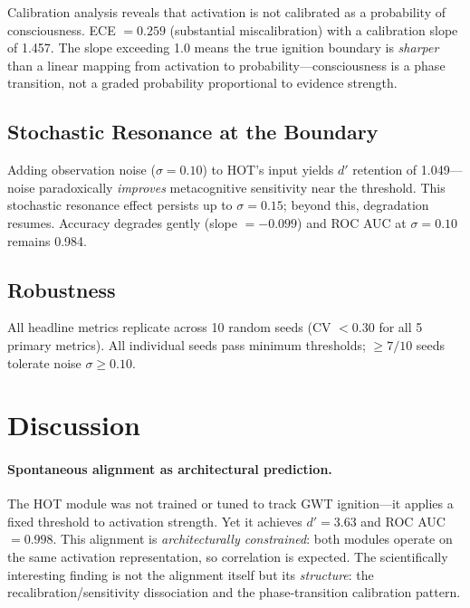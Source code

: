\documentclass[10pt,letterpaper]{article}
\newcommand{\dprime}{d'}
\begin{document}
Calibration analysis reveals that activation is not calibrated as a
probability of consciousness.  ECE $= 0.259$ (substantial
miscalibration) with a calibration slope of 1.457.  The slope exceeding
1.0 means the true ignition boundary is \emph{sharper} than a linear
mapping from activation to probability---consciousness is a phase
transition, not a graded probability proportional to evidence strength.

\subsection{Stochastic Resonance at the Boundary}

Adding observation noise ($\sigma = 0.10$) to HOT's input yields
$\dprime$ retention of 1.049---noise paradoxically \emph{improves}
metacognitive sensitivity near the threshold.  This stochastic resonance
effect persists up to $\sigma = 0.15$; beyond this, degradation
resumes.  Accuracy degrades gently (slope $= -0.099$) and ROC AUC
at $\sigma = 0.10$ remains 0.984.

\subsection{Robustness}

All headline metrics replicate across 10 random seeds (CV $< 0.30$ for
all 5 primary metrics).  All individual seeds pass minimum thresholds;
$\geq 7/10$ seeds tolerate noise $\sigma \geq 0.10$.


\section{Discussion}

\paragraph{Spontaneous alignment as architectural prediction.}
The HOT module was not trained or tuned to track GWT ignition---it
applies a fixed threshold to activation strength.  Yet it achieves
$\dprime = 3.63$ and ROC AUC $= 0.998$.  This alignment is
\emph{architecturally constrained}: both modules operate on the same
activation representation, so correlation is expected.  The scientifically
interesting finding is not the alignment itself but its \emph{structure}:
the recalibration/sensitivity dissociation and the phase-transition
calibration pattern.
\end{document}
